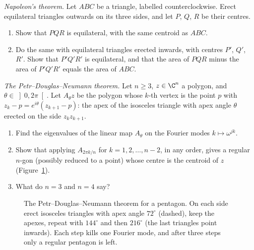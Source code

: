 \begin{exercise}[$\star\star$]\label{pb:napoleon}
\emph{Napoleon's theorem.} Let $ABC$ be a triangle, labelled counterclockwise. Erect equilateral triangles outwards on its
three sides, and let $P$, $Q$, $R$ be their centres.
\begin{enumerate}[label=(\alph*)]
\item Show that $PQR$ is equilateral, with the same centroid as $ABC$.
\item Do the same with equilateral triangles erected inwards, with centres $P'$, $Q'$, $R'$. Show that $P'Q'R'$ is
equilateral, and that the area of $PQR$ minus the area of $P'Q'R'$ equals the area of $ABC$.
\end{enumerate}
\end{exercise}

\begin{exercise}[$\star\star\star$]\label{pb:pdn}
\emph{The Petr--Douglas--Neumann theorem.} Let $n\ge3$, $z\in\C^n$ a polygon, and $\theta\in\left]0,2\pi\right[$. Let
$A_\theta z$ be the polygon whose $k$-th vertex is the point $p$ with $z_k-p=e^{i\theta}(z_{k+1}-p)$: the apex of the
isosceles triangle with apex angle $\theta$ erected on the side $z_kz_{k+1}$.
\begin{enumerate}[label=(\alph*)]
\item Find the eigenvalues of the linear map $A_\theta$ on the Fourier modes $k\mapsto\omega^{jk}$.
\item Show that applying $A_{2\pi k/n}$ for $k=1,2,\dots,n-2$, in any order, gives a regular $n$-gon (possibly reduced to a
point) whose centre is the centroid of $z$ (Figure~\ref{fig:pdn}).
\item What do $n=3$ and $n=4$ say?
\end{enumerate}
\end{exercise}

\begin{figure}[ht]
\centering
{}
\caption{The Petr--Douglas--Neumann theorem for a pentagon. On each side erect isosceles triangles with apex angle $72^\circ$
(dashed), keep the apexes, repeat with $144^\circ$ and then $216^\circ$ (the last triangles point inwards). Each step kills
one Fourier mode, and after three steps only a regular pentagon is left.}
\label{fig:pdn}
\end{figure}

